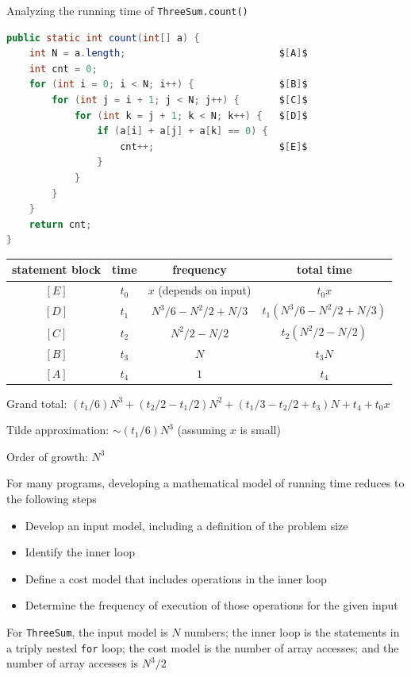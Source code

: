 \documentclass[8pt,a4paper,compress]{beamer}
\begin{document}
\begin{frame}[fragile]
\pause

Analyzing the running time of \lstinline{ThreeSum.count()}
\begin{lstlisting}[language=Java, mathescape]
public static int count(int[] a) {
    int N = a.length;                           $[A]$
    int cnt = 0;
    for (int i = 0; i < N; i++) {               $[B]$ 
        for (int j = i + 1; j < N; j++) {       $[C]$
            for (int k = j + 1; k < N; k++) {   $[D]$
                if (a[i] + a[j] + a[k] == 0) {
                    cnt++;                      $[E]$
                }
            }
        }
    }
    return cnt;
}
\end{lstlisting}

\pause

\begin{center}
\begin{tabular}{cccc}
statement block & time & frequency & total time\\ \hline
$[E]$ & $t_0$ & $x$ (depends on input) & $t_0x$ \\
$[D]$ & $t_1$ & $N^3/6-N^2/2+N/3$  & $t_1(N^3/6-N^2/2+N/3)$ \\
$[C]$ & $t_2$ & $N^2/2-N/2$  & $t_2(N^2/2-N/2)$ \\
$[B]$ & $t_3$ & $N$  & $t_3N$ \\
$[A]$ & $t_4$ & $1$  & $t_4$ 
\end{tabular} 
\end{center}

\pause

Grand total: $(t_1/6)N^3+(t_2/2-t_1/2)N^2+(t_1/3-t_2/2+t_3)N+t_4+t_0x$

\pause
\smallskip

Tilde approximation: $\sim(t_1/6)N^3$ (assuming $x$ is small)

\pause
\smallskip

Order of growth: $N^3$
\end{frame}

\begin{frame}[fragile]
\pause

For many programs, developing a mathematical model of running time reduces to the following steps
\begin{itemize}
\item Develop an input model, including a definition of the problem size
\item Identify the inner loop
\item Define a cost model that includes operations in the inner loop
\item Determine the frequency of execution of those operations for the given input
\end{itemize}

\pause
\bigskip

For \lstinline{ThreeSum}, the input model is $N$ numbers; the inner loop is the statements in a triply nested \lstinline{for} loop; the cost model is the number of array accesses; and the number of array accesses is $N^3/2$
\end{frame}
\end{document}
